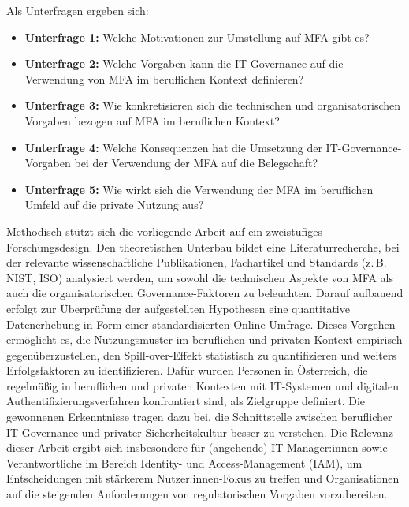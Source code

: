 Als Unterfragen ergeben sich:
\begin{itemize}

\item\textbf{Unterfrage 1:} Welche Motivationen zur Umstellung auf MFA gibt es? %
\item\textbf{Unterfrage 2:} Welche Vorgaben kann die IT-Governance auf die Verwendung von MFA im beruflichen Kontext definieren?
\item \textbf{Unterfrage 3:} Wie konkretisieren sich die technischen und organisatorischen Vorgaben bezogen auf MFA im beruflichen Kontext?
\item \textbf{Unterfrage 4:} Welche Konsequenzen hat die Umsetzung der IT-Governance-Vorgaben bei der Verwendung der MFA auf die Belegschaft?   
\item \textbf{Unterfrage 5:} Wie wirkt sich die Verwendung der MFA im beruflichen Umfeld auf die private Nutzung aus?

\end{itemize} 
Methodisch stützt sich die vorliegende Arbeit auf ein zweistufiges Forschungsdesign. Den theoretischen Unterbau bildet eine Literaturrecherche, bei der relevante wissenschaftliche Publikationen, Fachartikel und Standards (z.\,B. NIST, ISO) analysiert werden, um sowohl die technischen Aspekte von MFA als auch die organisatorischen Governance-Faktoren zu beleuchten.
Darauf aufbauend erfolgt zur Überprüfung der aufgestellten Hypothesen eine quantitative Datenerhebung in Form einer standardisierten Online-Umfrage. Dieses Vorgehen ermöglicht es, die Nutzungsmuster im beruflichen und privaten Kontext empirisch gegenüberzustellen, den Spill-over-Effekt statistisch zu quantifizieren und weiters Erfolgsfaktoren zu identifizieren.
Dafür wurden Personen in Österreich, die regelmäßig in beruflichen und privaten Kontexten mit IT-Systemen und digitalen Authentifizierungsverfahren konfrontiert sind, als Zielgruppe definiert. Die gewonnenen Erkenntnisse tragen dazu bei, die Schnittstelle zwischen beruflicher IT-Governance und privater Sicherheitskultur besser zu verstehen.
Die Relevanz dieser Arbeit ergibt sich insbesondere für (angehende) IT-Manager:innen sowie Verantwortliche im Bereich Identity- und Access-Management (IAM), um Entscheidungen mit stärkerem Nutzer:innen-Fokus zu treffen und Organisationen auf die steigenden Anforderungen von regulatorischen Vorgaben vorzubereiten.